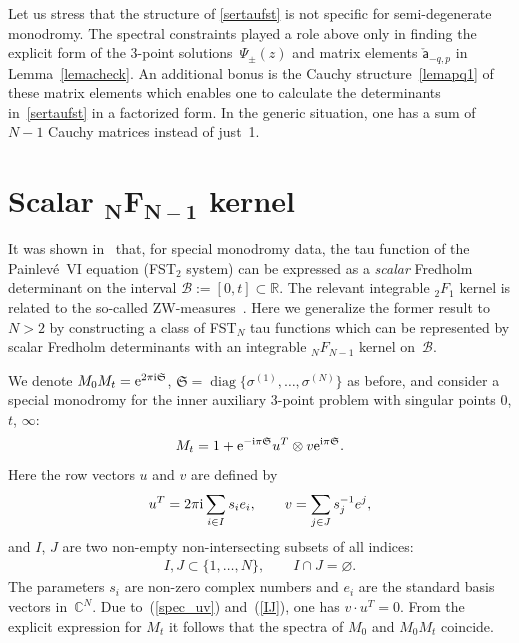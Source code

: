\documentclass[pdftex]{sigma}
\def\mf{\mathfrak}
\numberwithin{equation}{section}
\begin{document}
Let us stress that the structure of \eqref{sertaufst} is not specific for semi-degenerate monodromy. The spectral constraints played a role above only in finding the explicit form of the 3-point solu\-tions~$\Psi_{\pm}(z)$ and matrix elements $\check{\mathsf a}_{-q,p}$ in Lemma~\ref{lemacheck}. An additional bonus is the Cauchy structure~\eqref{lemapq1} of these matrix elements which enables one to calculate the determinants in~\eqref{sertaufst} in a factorized form. In the generic situation, one has a sum of $N-1$ Cauchy matrices instead of just~1.

\section[Scalar $_N F_{N-1}$ kernel]{Scalar $\boldsymbol{_N F_{N-1}}$ kernel} \label{sec_fred}

 It was shown in~\cite{GL16} that, for special monodromy data, the tau function of the Painlev\'e~VI equation (FST$_2$ system) can be expressed as a \textit{scalar} Fredholm determinant on the interval $\mathcal B:=[0,t]\subset \mathbb R$. The relevant integrable ${}_2F_1$ kernel is related to the so-called ZW-measures~\cite{BO}. Here we generalize the former result to $N>2$ by constructing a class of FST$_N$ tau functions which can be represented by scalar Fredholm determinants with an integrable ${}_NF_{N-1}$ kernel on~$\mathcal B$.

We denote $M_0M_t={\rm e}^{2\pi{\rm i} \mathfrak S}$, $\mathfrak S=\operatorname{diag}\big\{\sigma^{(1)},\ldots,\sigma^{(N)}\big\}$ as before, and consider a special monodromy for the inner auxiliary 3-point problem with singular points $0$, $t$, $\infty$:
\begin{gather}
M_t=1+{\rm e}^{-{\rm i}\pi {\mf S}} u^T \otimes v {\rm e}^{{\rm i}\pi {\mf S}} .\label{eq:monodromy:nilpotent}
\end{gather}
Here the row vectors $u$ and $v$ are defined by
\begin{gather}\label{spec_uv}
u^T=2\pi{\rm i}\sum_{i\in I}s_i e_i,\qquad v=\sum_{j\in J}s_j^{-1} e^j ,
\end{gather}
and $I$, $J$ are two non-empty non-intersecting subsets of all indices:
\begin{gather}\label{IJ}
I, J\subset \{1,\ldots,N\} ,\qquad I\cap J=\varnothing.
\end{gather}
The parameters $s_i$ are non-zero complex numbers and $e_i$ are the standard basis vectors in~${\mathbb C}^N$. Due to~(\ref{spec_uv}) and~(\ref{IJ}), one has $v\cdot u^T=0$. From the explicit expression for $M_t$ it follows that the spectra of $M_0$ and $M_{0}M_t$ coincide.
\end{document}
